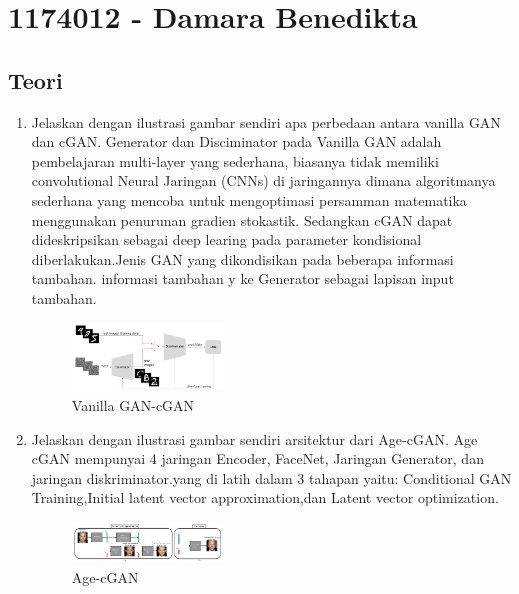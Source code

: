 \section{1174012 - Damara Benedikta}

\subsection{Teori}
\begin{enumerate}

        \item Jelaskan dengan ilustrasi gambar sendiri apa perbedaan antara vanilla GAN dan cGAN.
		Generator dan Disciminator pada Vanilla GAN adalah pembelajaran multi-layer yang sederhana, biasanya tidak memiliki convolutional Neural Jaringan (CNNs) di jaringannya
        dimana algoritmanya sederhana yang mencoba untuk mengoptimasi persamman matematika menggunakan penurunan gradien stokastik.
        Sedangkan cGAN dapat dideskripsikan sebagai deep learing pada parameter kondisional diberlakukan.Jenis GAN yang dikondisikan pada beberapa informasi tambahan.  
        informasi tambahan y ke Generator sebagai lapisan input tambahan. 

			\begin{figure}[H]
            	\includegraphics[width=4cm]{figures/1174012/chapter9/teori1.png}
           		\centering
           		\caption{Vanilla GAN-cGAN}
            \end{figure}

        \item Jelaskan dengan ilustrasi gambar sendiri arsitektur dari Age-cGAN.
		Age cGAN mempunyai 4 jaringan Encoder, FaceNet, Jaringan Generator,
        dan jaringan diskriminator.yang  di latih dalam 3 tahapan yaitu: Conditional GAN Training,Initial latent 
        vector approximation,dan Latent vector optimization.
			\begin{figure}[H]
				\includegraphics[width=4cm]{figures/1174012/chapter9/teori2.png}
            		\centering
           		\caption{Age-cGAN}
            \end{figure}
                

\end{enumerate}
